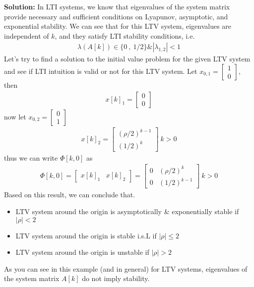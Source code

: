 \documentclass[twoside]{article}
\begin{document}
\textbf{Solution:} In LTI systems, we know that eigenvalues of the system matrix provide necessary and sufficient conditions on
Lyapunov, asymptotic, and exponential stability. We can see that for this LTV system, eigenvalues are independent of $k$, and
they satisfy LTI stability conditions, i.e.
%
\begin{align*}
  \lambda(A[k]) \in \lbrace 0 \ , \ 1/2 \rbrace \& | \lambda_{1,2} | < 1
\end{align*}
%
Let's try to find a solution to the initial value problem for the given LTV system and see if LTI intuition is valid or not for this LTV system. Let $x_{0,1} = \begin{bmatrix} 1 \\ 0 \end{bmatrix}$, then
%
\begin{align*}
   x[k]_1 = \begin{bmatrix} 0 \\ 0 \end{bmatrix}
\end{align*}
%
now let $x_{0,2} = \begin{bmatrix} 0 \\ 1 \end{bmatrix}$
%
%
\begin{align*}
   x[k]_2 = \begin{bmatrix} (\rho/2)^{k-1} \\ (1/2)^k \end{bmatrix} \ k>0
\end{align*}
%
thus we can write $\Phi[k,0]$ as
%
\begin{align*}
   \Phi[k,0] = \begin{bmatrix} x[k]_1 & x[k]_2 \end{bmatrix} = 
   \begin{bmatrix} 0 & (\rho/2)^k \\ 0 & (1/2)^{k-1} \end{bmatrix} \ k > 0 
\end{align*}
%
Based on this result, we can conclude that.
%
\begin{itemize}
    \item LTV system around the origin is asymptotically \& exponentially stable if $|\rho| < 2$
    \item LTV system around the origin is stable i.s.L if $|\rho| \leq 2$
    \item LTV system around the origin is unstable if $|\rho| > 2$
\end{itemize}
%
As you can see in this example (and in general) for LTV systems, eigenvalues of the system matrix $A[k]$ do not imply stability.
\end{document}
